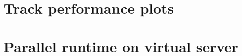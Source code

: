
\begin{appendices}
	\section{Track performance plots}
	 \clearpage
	\section{Parallel runtime on virtual server}
	 \clearpage
\end{appendices}

	



